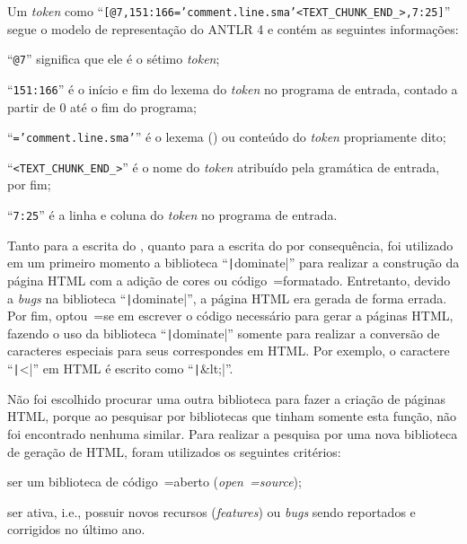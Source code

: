 Um \textit{token} como ``\texttt{[@7,151:166='comment.line.sma'<TEXT_CHUNK_END_>,7:25]}'' segue o modelo de representação do ANTLR 4 \cite{antlrBookTerrentParr} e
contém as seguintes informações:
\begin{inparaenum}[1)]
\item ``\texttt{@7}'' significa que ele é o sétimo \textit{token};
\item ``\texttt{151:166}'' é o início e
fim do lexema do \textit{token} no programa de entrada,
contado a partir de 0 até o fim do programa;
\item ``\texttt{='comment.line.sma'}'' é o lexema () ou
conteúdo do \textit{token} propriamente dito;
\item ``\texttt{<TEXT_CHUNK_END_>}'' é o nome do \textit{token} atribuído pela gramática de entrada,
por fim;
\item ``\texttt{7:25}'' é a linha e
coluna do \textit{token} no programa de entrada.
\end{inparaenum}%

Tanto para a escrita do ,
quanto para a escrita do  por consequência,
foi utilizado em um primeiro momento a biblioteca ``\texttt|dominate|'' para realizar a construção da página HTML com a adição de cores ou
código~=formatado. Entretanto,
devido a \textit{bugs} na biblioteca ``\texttt|dominate|'',
a página HTML era gerada de forma errada.
Por fim,
optou~=se em escrever o código necessário para gerar a páginas HTML,
fazendo o uso da biblioteca ``\texttt|dominate|'' somente para realizar a conversão de caracteres especiais para seus correspondes em HTML.
Por exemplo,
o caractere ``\texttt|<|'' em HTML é escrito como ``\texttt|&lt;|''.

Não foi escolhido procurar uma outra biblioteca para fazer a criação de páginas HTML,
porque ao pesquisar por bibliotecas que tinham somente esta função,
não foi encontrado nenhuma similar.
Para realizar a pesquisa por uma nova biblioteca de geração de HTML,
foram utilizados os seguintes critérios:
\begin{inparaenum}[1)]
\item ser um biblioteca de código~=aberto (\textit{open~=source});
\item ser ativa,
i.e.,
possuir novos recursos (\textit{features}) ou
\textit{bugs} sendo reportados e
corrigidos no último ano.
\end{inparaenum}%

